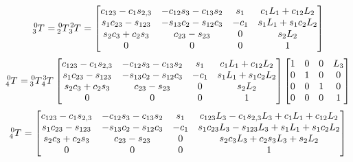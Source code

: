 \documentclass[10pt]{article}
\begin{document}
\[
\tensor*[^{0}_{3}]{T}{} = 
\tensor*[^{0}_{2}]{T}{} \tensor*[^{2}_{3}]{T}{} =
\begin{bmatrix}
c_{123}-c_{1}s_{2,3}   & -c_{12}s_{3}-c_{13}s_{2} & s_{1} & c_{1}L_{1} + c_{12}L_{2}\\
s_{1}c_{23}-s_{123}    & -s_{13}c_{2}-s_{12}c_{3} & -c_{1}& s_{1}L_{1} + s_{1}c_{2}L_{2}\\
s_{2}c_{3}+c_{2}s_{3}  & c_{23}-s_{23}            & 0     & s_{2}L_{2}\\
0                      & 0                        & 0     & 1
\end{bmatrix}
\]
\[
\tensor*[^{0}_{4}]{T}{} =
\tensor*[^{0}_{3}]{T}{} \tensor*[^{3}_{4}]{T}{} 
\begin{bmatrix}
c_{123}-c_{1}s_{2,3}   & -c_{12}s_{3}-c_{13}s_{2} & s_{1} & c_{1}L_{1} + c_{12}L_{2}\\
s_{1}c_{23}-s_{123}    & -s_{13}c_{2}-s_{12}c_{3} & -c_{1}& s_{1}L_{1} + s_{1}c_{2}L_{2}\\
s_{2}c_{3}+c_{2}s_{3}  & c_{23}-s_{23}            & 0     & s_{2}L_{2}\\
0                      & 0                        & 0     & 1
\end{bmatrix}
\begin{bmatrix}
1    & 0    & 0     & L_{3}  \\
0    & 1    & 0     & 0      \\
0    & 0    & 1     & 0      \\
0    & 0    & 0     & 1
\end{bmatrix}
\]
\[
\tensor*[^{0}_{4}]{T}{} =
\begin{bmatrix}
c_{123}-c_{1}s_{2,3}   & -c_{12}s_{3}-c_{13}s_{2} & s_{1} & c_{123}L_{3} - c_{1}s_{2,3}L_{3} + c_{1}L_{1} + c_{12}L_{2}\\
s_{1}c_{23}-s_{123}    & -s_{13}c_{2}-s_{12}c_{3} & -c_{1}& s_{1}c_{23}L_{3} - s_{123}L_{3} + s_{1}L_{1} + s_{1}c_{2}L_{2}\\
s_{2}c_{3}+c_{2}s_{3}  & c_{23}-s_{23}            & 0     & s_{2}c_{3}L_{3} + c_{2}s_{3}L_{3} + s_{2}L_{2}\\
0                      & 0                        & 0     & 1
\end{bmatrix}
\]
\end{document}
